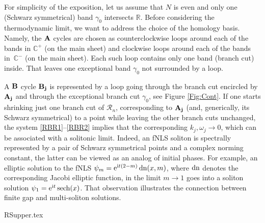 \documentclass[pdftex]{sigma}
\numberwithin{equation}{section}
\def\ra{\rightarrow}
\renewcommand{\o}{\omega}
\newcommand{\g}{\gamma}
\def\Rscr{\mathcal{R}}
\newcommand{\sech}{\hbox{sech}}
\def\C{{\mathbb C}}
\def\R{{\mathbb R}}
\def\g{\gamma}
\def\dn{\mathop{\rm dn}\nolimits}
\def\sech{\mathop{\rm sech}\nolimits}
\def\o{\omega}
\def\g{\gamma}
\begin{document}
For simplicity of the exposition, let us assume that $N$ is even and only one (Schwarz symmetrical) band $\g_0$ intersects $\R$.
Before considering the thermodynamic limit, we want to address the choice of the homology basis. Namely, the $\bf A$ cycles are chosen as counterclockwise loops around each of the bands in $\C^+$ (on the main sheet) and clockwise loops around each of the bands in~$\C^-$ (on the main sheet). Each such loop contains only one band (branch cut) inside.
That leaves one exceptional band $\g_0$ not surrounded by a loop.

A $\bf B$ cycle $\bf B_j$ is represented by a loop going through the branch cut encircled by $\bf A_j$ and through
the exceptional branch cut $\g_0$,
see Figure \ref{Fig:Cont}.
If one starts shrinking just one branch cut of $\Rscr_n$, corresponding to $\bf A_j$ (and, generically, its Schwarz symmetrical) to a point while leaving the other branch cuts unchanged, the system \eqref{RBR1}--\eqref{RBR2} implies that the corresponding $k_j,\o_j\ra 0$, which can be associated with a solitonic limit. Indeed, an fNLS soliton is spectrally represented by a pair of Schwarz symmetrical points and a complex norming constant, the latter can be viewed as an analog of initial phases. For example, an elliptic solution to the fNLS $\psi_{m} = {\rm e}^{{\rm i}t(2-m)}\dn(x,m) $, where $\dn$ denotes the corresponding Jacobi elliptic function, in the limit $m\ra 1$ goes into a soliton solution $\psi_{1} = {\rm e}^{{\rm i}t}\sech(x) $. That observation illustrates the connection between finite gap and multi-soliton solutions.

{RSupper.tex}
\end{document}
